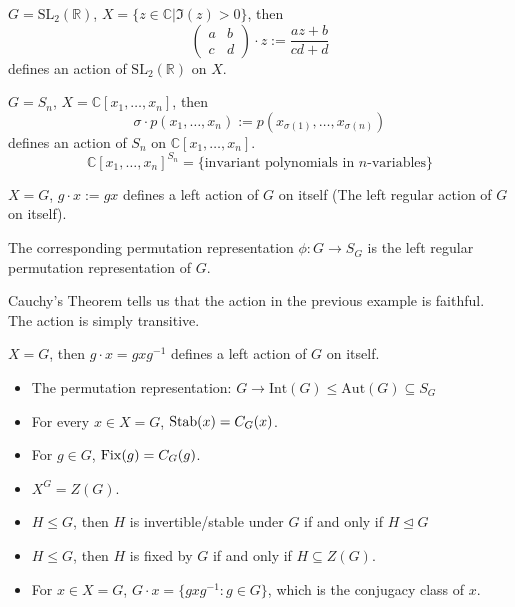 \documentclass{article}
\begin{document}
\begin{example}
    $G=\text{SL}_2(\mathbb{R})$, $X=\{z\in \mathbb{C}|\Im(z)>0\}$, then
    \begin{equation*}
        \begin{pmatrix}
            a & b \\c&d
        \end{pmatrix} \cdot z := \frac{az+b}{cd+d}
    \end{equation*}
    defines an action of $\text{SL}_2(\mathbb{R})$ on $X$.
\end{example}
\begin{example}
    $G=S_n$, $X=\mathbb{C}[x_1,\dots,x_n]$, then
    \begin{equation*}
        \sigma\cdot p(x_1,\dots,x_n):=p(x_{\sigma(1)},\dots,x_{\sigma(n)})
    \end{equation*}
    defines an action of $S_n$ on $\mathbb{C}[x_1,\dots,x_n]$.
    \begin{equation*}
        \mathbb{C}[x_1,\dots,x_n]^{S_n} =\{\text{invariant polynomials in $n$-variables}\}
    \end{equation*}
\end{example}
\begin{example}
    $X=G$, $g\cdot x:= gx$ defines a left action of $G$ on itself (The left regular action of $G$ on itself).

    The corresponding permutation representation $\phi:G\rightarrow S_G$ is the left regular permutation representation of $G$.
\end{example}
\begin{idea}
    Cauchy's Theorem tells us that the action in the previous example is faithful. The action is simply transitive.
\end{idea}
\begin{example}
    $X=G$, then $g\cdot x=gxg^{-1}$ defines a left action of $G$ on itself.
    \begin{itemize}
        \item The permutation representation: $G\rightarrow \text{Int}(G) \le \text{Aut}(G) \subseteq S_G$
        \item For every $x\in X=G$, $\operatorname{Stab}(x)=C_G(x)$.
        \item For $g\in G$, $\operatorname{Fix}(g)=C_G(g)$.
        \item $X^G=Z(G)$.
        \item $H\le G$, then $H$ is invertible/stable under $G$ if and only if $H \trianglelefteq G$
        \item $H \le G$, then $H$ is fixed by $G$ if and only if $H \subseteq Z(G)$.
        \item For $x\in X=G$, $G\cdot x = \{gxg^{-1}:g\in G\}$, which is the conjugacy class of $x$.
    \end{itemize}
\end{example}
\end{document}

